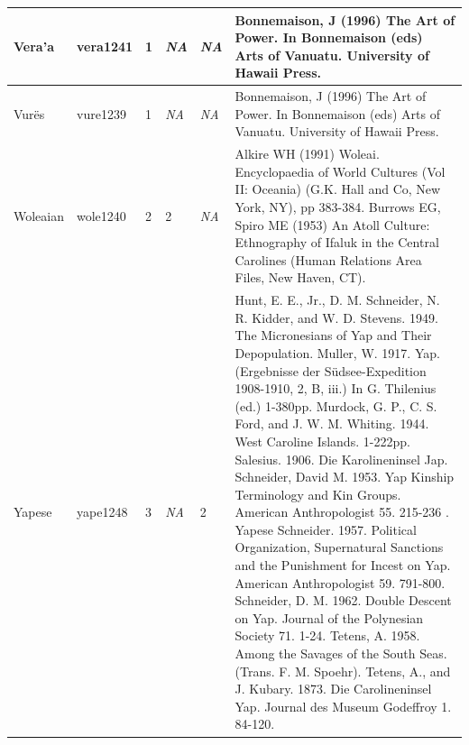 \documentclass[draft,10pt]{article} %
\begin{document}
\begin{landscape}
\begin{longtable}{ | p{2cm}| p{2cm}| p{1.8cm}| p{1.8cm}| p{3cm}| p{9cm}| }
Vera'a&vera1241&1&\emph{NA}&\emph{NA}&Bonnemaison, J (1996) The Art of Power. In Bonnemaison (eds) Arts of Vanuatu. University of Hawaii Press.\\ \hline
Vurës&vure1239&1&\emph{NA}&\emph{NA}&Bonnemaison, J (1996) The Art of Power. In Bonnemaison (eds) Arts of Vanuatu. University of Hawaii Press.\\ \hline
Woleaian&wole1240&2&2&\emph{NA}&Alkire WH (1991) Woleai. Encyclopaedia of World Cultures (Vol II: Oceania) (G.K. Hall and Co, New York, NY), pp 383-384. Burrows EG, Spiro ME (1953) An Atoll Culture: Ethnography of Ifaluk in the Central Carolines (Human Relations Area Files, New Haven, CT). \\ \hline
Yapese&yape1248&3&\emph{NA}&2&Hunt, E. E., Jr., D. M. Schneider, N. R. Kidder, and W. D. Stevens. 1949. The Micronesians of Yap and Their Depopulation. Muller, W. 1917. Yap. (Ergebnisse der Südsee-Expedition 1908-1910, 2, B, iii.) In G. Thilenius (ed.) 1-380pp. Murdock, G. P., C. S. Ford, and J. W. M. Whiting. 1944. West Caroline Islands. 1-222pp. Salesius. 1906. Die Karolineninsel Jap. Schneider, David M. 1953. Yap Kinship Terminology and Kin Groups. American Anthropologist 55. 215-236 .  Yapese   Schneider. 1957. Political Organization, Supernatural Sanctions and the Punishment for Incest on Yap. American Anthropologist 59. 791-800. Schneider, D. M. 1962. Double Descent on Yap. Journal of the Polynesian Society 71. 1-24. Tetens, A. 1958. Among the Savages of the South Seas. (Trans. F. M. Spoehr). Tetens, A., and J. Kubary. 1873. Die Carolineninsel Yap. Journal des Museum Godeffroy 1. 84-120.\\ \hline



 \end{longtable}

\end{landscape}

\newpage
\end{document}
